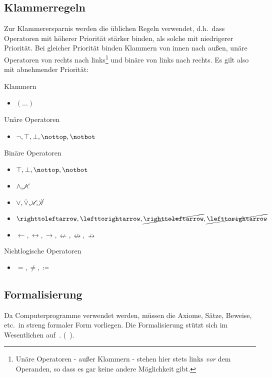 \documentclass[english,ngerman,parskip=half,headsepline,footsepline]{scrreprt}
\makeatletter
\newcommand{\lutrue}{\operatorname{\top}}      %
\newcommand{\lnufalse}{\operatorname{\notbot}} %
\newcommand{\lufalse}{\operatorname{\bot}}     %
\newcommand{\lnutrue}{\operatorname{\nottop}}  %
\newcommand{\lbtrue}{\operatorname{\top}}              %
\newcommand{\lnbfalse}{\operatorname{\notbot}}         %
\newcommand{\lnxor}{\operatorname{\cancel{\lxor}}}     %
\newcommand{\lleftimp}{\operatorname{\leftarrow}}      %
\newcommand{\lleft}{\operatorname{\righttoleftarrow}}  %
\newcommand{\limp}{\operatorname{\rightarrow}}         %
\newcommand{\lright}{\operatorname{\lefttorightarrow}} %
\newcommand{\lequiv}{\operatorname{\leftrightarrow}}   %
\newcommand{\lnand}{\operatorname{\cancel{\land}}}     %
\newcommand{\lnequiv}{\operatorname{\nleftrightarrow}} %
\newcommand{\lxor}{\operatorname{\dot{\lor}}}          %
\newcommand{\lnright}{\operatorname{\cancel{\lright}}} %
\newcommand{\lnimp}{\operatorname{\nrightarrow}}       %
\newcommand{\lnleft}{\operatorname{\cancel{\lleft}}}   %
\newcommand{\lnleftimp}{\operatorname{\nleftarrow}}    %
\newcommand{\lnor}{\operatorname{\cancel{\lor}}}       %
\newcommand{\lbfalse}{\operatorname{\bot}}             %
\newcommand{\lnbtrue}{\operatorname{\nottop}    }      %
\newcommand{\defeq}{\coloneqq}
\newcommand{\textdh}{d.\@ h.\@}
\newcommand{\textetc}{etc.\@}
\makeatother
\begin{document}
	\subsection{Klammerregeln}
	\label{sub:Klammerregeln}

	Zur Klammerersparnis werden die üblichen Regeln verwendet, \textdh\ dass Operatoren mit höherer Priorität stärker binden, als solche mit niedrigerer Priorität. Bei gleicher Priorität binden Klammern von innen nach außen, unäre Operatoren von rechts nach links\footnote{ Unäre Operatoren - außer Klammern - stehen hier stets links \emph{vor} dem Operanden, so dass es gar keine andere Möglichkeit gibt.} und binäre von links nach rechts. Es gilt also mit abnehmender Priorität:

	Klammern
	\begin{itemize}
		\item $(\dots)$
	\end{itemize}
	Unäre Operatoren
	\begin{itemize}
		\item $\lnot, \lutrue, \lufalse, \lnutrue, \lnufalse$
	\end{itemize}
	Binäre Operatoren
	\begin{itemize}
		\item $\lbtrue, \lbfalse, \lnbtrue, \lnbfalse$
		\item $\land, \lnand$
		\item $\lor, \lxor, \lnor, \lnxor$
		\item $\lleft, \lright, \lnleft, \lnright$
		\item $\lleftimp, \lequiv, \limp, \lnleftimp, \lnequiv, \lnimp$
	\end{itemize}
	Nichtlogische Operatoren
	\begin{itemize}
		\item $=, \ne, \defeq$
	\end{itemize}

	\subsection{Formalisierung}
	\label{sub:Formalisierung}

	Da Computerprogramme verwendet werden, müssen die Axiome, Sätze, Beweise, \textetc\ in streng formaler Form vorliegen. Die Formalisierung stützt sich im Wesentlichen auf~\cite{bib:Aussagenlogik}. (\alsoname~\cite{bib:LogikDe, bib:LogikEn}).

	\begingroup
		\newcommand{\Item}[3]{\item[]\begin{tabbing}\hspace{0.7cm}\=\hspace{5cm}\=\kill#1\>#2\>#3\end{tabbing}}
\end{document}
